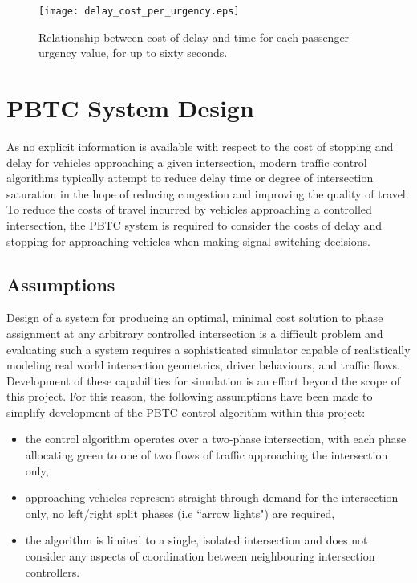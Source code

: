 
\begin{figure}[]
\centering
	\texttt{[image: delay\_cost\_per\_urgency.eps]}
	\caption{Relationship between cost of delay and time for each passenger urgency value, for up to sixty seconds. }
\label{delaycosturgency}
\end{figure}

\section{PBTC System Design}
 
As no explicit information is available with respect to the cost of stopping and delay for vehicles approaching a given intersection, modern traffic control algorithms typically attempt to reduce delay time or degree of intersection saturation in the hope of reducing congestion and improving the quality of travel. To reduce the costs of travel incurred by vehicles approaching a controlled intersection, the PBTC system is required to consider the costs of delay and stopping for approaching vehicles when making signal switching decisions.

\subsection{Assumptions}

Design of a system for producing an optimal, minimal cost solution to phase assignment at any arbitrary controlled intersection is a difficult problem and evaluating such a system requires a sophisticated simulator capable of realistically modeling real world intersection geometrics, driver behaviours, and traffic flows. Development of these capabilities for simulation is an effort beyond the scope of this project. For this reason, the following assumptions have been made to simplify development of the PBTC control algorithm within this project:

\begin{itemize}
\item the control algorithm operates over a two-phase intersection, with each phase allocating green to one of two flows of traffic approaching the intersection only,
\item approaching vehicles represent straight through demand for the intersection only, no left/right split phases (i.e ``arrow lights") are required,
\item the algorithm is limited to a single, isolated intersection and does not consider any aspects of coordination between neighbouring intersection controllers.
\end{itemize}

